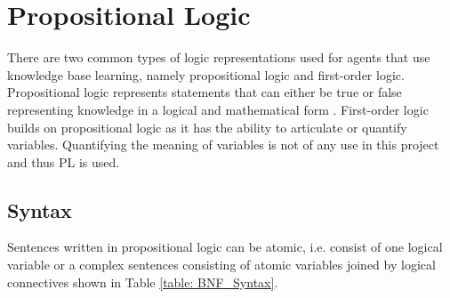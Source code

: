 \section{Propositional Logic}


There are two common types of logic representations used for agents that use knowledge base learning, namely propositional logic and first-order logic. Propositional logic  represents statements that can either be true or false representing knowledge in a logical and mathematical form \cite{Logic}. First-order logic builds on propositional logic as it has the ability to articulate or quantify variables. Quantifying the meaning of variables is not of any use in this project and thus PL is used.



\subsection{Syntax}




Sentences written in propositional logic can be atomic, i.e. consist of one logical variable or a complex sentences consisting of atomic variables joined by logical connectives shown in Table \ref{table: BNF_Syntax}.

